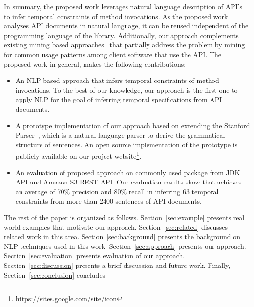 In summary, the proposed work leverages natural language description of API's to infer temporal constraints of method invocations.
As the proposed work analyzes API documents in natural language, it can be reused independent of the programming language of the library.
Additionally, our approach complements existing mining based approaches~\cite{buse2012synthesizing, thummalapenta07parseweb, Wang:2013:MSR, Zhong:2009:MMR} that partially address the problem by mining for common usage patterns among client software that use the API.
The proposed work in general, makes the following contributions:


\begin{itemize}
	\item An NLP based approach that infers temporal constraints of method invocations. 
	To the best of our knowledge, our approach is the first one to apply NLP for the goal of inferring temporal specifications from API documents.
	\item A prototype implementation of our approach based on extending the Stanford Parser~\cite{Klein03,SNLP1}, which is a natural language parser to derive the grammatical structure of sentences.
	An open source implementation of the prototype is publicly available on our project website\footnote{\url{https://sites.google.com/site/icon}}. 
	\item An evaluation of proposed approach on 
commonly used package  from JDK API and Amazon
S3 REST API. Our evaluation results show that  achieves
an average of 70\% precision and 80\% recall in inferring 63
temporal constraints from more than 2400 sentences of API
documents.
\end{itemize}


The rest of the paper is organized as follows.
Section~\ref{sec:example} presents real world examples that motivate our approach.
Section~\ref{sec:related} discusses related work in this area.
Section~\ref{sec:background} presents the  background on NLP techniques used in this work.
Section~\ref{sec:approach} presents our approach.
Section~\ref{sec:evaluation} presents evaluation of our approach.
Section~\ref{sec:discussion} presents a brief discussion and future work.
Finally, Section~\ref{sec:conclusion} concludes.


